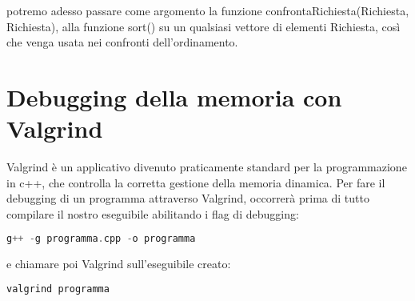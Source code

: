 \documentclass[a4paper,12pt]{article}
\begin{document}
potremo adesso passare come argomento la funzione confrontaRichiesta(Richiesta, Richiesta), alla funzione sort()
su un qualsiasi vettore di elementi Richiesta, così che venga usata nei confronti dell'ordinamento.

\section{Debugging della memoria con Valgrind}
Valgrind è un applicativo divenuto praticamente standard per la programmazione in c++, che controlla la corretta gestione
della memoria dinamica. Per fare il debugging di un programma attraverso Valgrind, occorrerà prima di tutto
compilare il nostro eseguibile abilitando i flag di debugging:
\begin{lstlisting}[language=C++]
g++ -g programma.cpp -o programma
\end{lstlisting}
e chiamare poi Valgrind sull'eseguibile creato:
\begin{lstlisting}[language=C++]
valgrind programma
\end{lstlisting}
\end{document}
